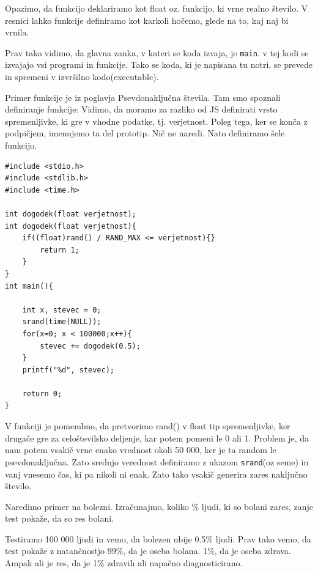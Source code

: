 \documentclass[a4paper, 12pt]{article}
\begin{document}
\begin{center}
\end{center}

Opazimo, da funkcijo deklariramo kot float oz. funkcijo, ki vrne realno število. V resnici lahko funkcije definiramo kot karkoli hočemo, glede na to, kaj naj bi vrnila.

Prav tako vidimo, da glavna zanka, v kateri se koda izvaja, je \texttt{main}. v tej kodi se izvajajo vsi programi in funkcije. Tako se koda, ki je napisana tu notri, se prevede in spremeni v izvršilno kodo(executable).

Primer funkcije je iz poglavja Psevdonaključna števila. Tam smo spoznali definiranje funkcije:
 Vidimo, da moramo za razliko od JS definirati vrsto spremenljivke, ki gre v vhodne podatke, tj. verjetnost. Poleg tega, ker se konča z podpičjem, imenujemo ta del prototip. Nič ne naredi. Nato definiramo šele funkcijo.

\begin{lstlisting}
#include <stdio.h>
#include <stdlib.h>
#include <time.h>

int dogodek(float verjetnost);
int dogodek(float verjetnost){
	if((float)rand() / RAND_MAX <= verjetnost){}
		return 1;
	}
}
int main(){

	int x, stevec = 0;
	srand(time(NULL));
	for(x=0; x < 100000;x++){
		stevec += dogodek(0.5);
	}
	printf("%d", stevec);

	return 0;
}
\end{lstlisting}

V funkciji je pomembno, da pretvorimo rand() v float tip spremenljivke, ker drugače gre za celoštevilsko deljenje, kar potem pomeni le 0 ali 1. Problem je, da nam potem vsakič vrne enako vrednost okoli 50 000, ker je ta random le psevdonaključna. Zato srednjo verednost definiramo z ukazom \texttt{srand}(oz seme) in vanj vnesemo čas, ki pa nikoli ni enak. Zato tako vsakič generira zares naključno število.

Naredimo primer na bolezni. Izračunajmo, koliko \% ljudi, ki so bolani zares, zanje test pokaže, da so res bolani.

Testiramo 100 000 ljudi in vemo, da bolezen ubije 0.5\% ljudi. Prav tako vemo, da test pokaže z natančnostjo 99\%, da je oseba bolana. 1\%, da je oseba zdrava. Ampak ali je res, da je 1\% zdravih ali napačno diagnosticirano.
\end{document}
